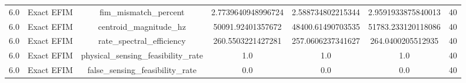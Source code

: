 \begin{table}[t]
\begin{tabular}{lcccccc}
6.0 & Exact EFIM & fim_mismatch_percent & 2.7739640948996724 & 2.588734802215344 & 2.9591933875840013 & 40 \\
6.0 & Exact EFIM & centroid_magnitude_hz & 50091.92401357672 & 48400.61490703535 & 51783.233120118086 & 40 \\
6.0 & Exact EFIM & rate_spectral_efficiency & 260.5503221427281 & 257.0606237341627 & 264.0400205512935 & 40 \\
6.0 & Exact EFIM & physical_sensing_feasibility_rate & 1.0 & 1.0 & 1.0 & 40 \\
6.0 & Exact EFIM & false_sensing_feasibility_rate & 0.0 & 0.0 & 0.0 & 40 \\
\hline
\end{tabular}
\end{table}
